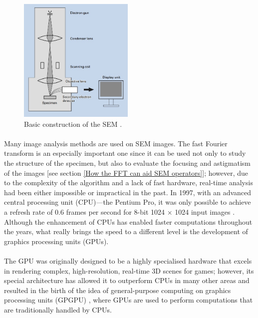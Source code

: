 \documentclass[12pt, twocolumn]{report}
\begin{document}
\begin{figure}[htbp]
    \centering
    \includegraphics[width=0.49\textwidth]{Figures/SEM basic construction.jpg}
    \caption{Basic construction of the SEM \cite{SEM A to Z}.}
    \label{SEM basic construction}
\end{figure}

\paragraph{}
Many image analysis methods are used on SEM images. The fast Fourier transform is an especially important one since it can be used not only to study the structure of the specimen, but also to evaluate the focusing and astigmatism of the images [see section \ref{How the FFT can aid SEM operators}]; however, due to the complexity of the algorithm and a lack of fast hardware, real-time analysis had been either impossible or impractical in the past. In 1997, with an advanced central processing unit (CPU)---the Pentium Pro, it was only possible to achieve a refresh rate of 0.6 frames per second for 8-bit 1024 $\times$ 1024 input images \cite{SEM image sharpness measurement}. Although the enhancement of CPUs has enabled faster computations throughout the years, what really brings the speed to a different level is the development of graphics processing units (GPUs).

\paragraph{}
The GPU was originally designed to be a highly specialised hardware that excels in rendering complex, high-resolution, real-time 3D scenes for games; however, its special architecture has allowed it to outperform CPUs in many other areas and resulted in the birth of the idea of general-purpose computing on graphics processing units (GPGPU) \cite{GPU computing}, where GPUs are used to perform computations that are traditionally handled by CPUs.
\end{document}
